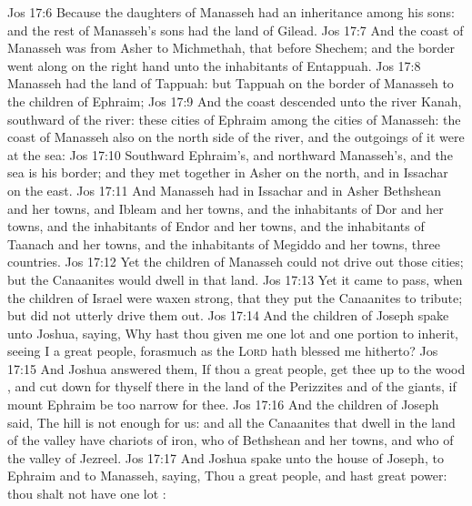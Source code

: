 \vs Jos 17:6 Because the daughters of Manasseh had an inheritance among his sons: and the rest of Manasseh's sons had the land of Gilead.
\vs Jos 17:7 And the coast of Manasseh was from Asher to Michmethah, that  before Shechem; and the border went along on the right hand unto the inhabitants of Entappuah.
\vs Jos 17:8  Manasseh had the land of Tappuah: but Tappuah on the border of Manasseh  to the children of Ephraim;
\vs Jos 17:9 And the coast descended unto the river Kanah, southward of the river: these cities of Ephraim  among the cities of Manasseh: the coast of Manasseh also  on the north side of the river, and the outgoings of it were at the sea:
\vs Jos 17:10 Southward  Ephraim's, and northward  Manasseh's, and the sea is his border; and they met together in Asher on the north, and in Issachar on the east.
\vs Jos 17:11 And Manasseh had in Issachar and in Asher Bethshean and her towns, and Ibleam and her towns, and the inhabitants of Dor and her towns, and the inhabitants of Endor and her towns, and the inhabitants of Taanach and her towns, and the inhabitants of Megiddo and her towns,  three countries.
\vs Jos 17:12 Yet the children of Manasseh could not drive out  those cities; but the Canaanites would dwell in that land.
\vs Jos 17:13 Yet it came to pass, when the children of Israel were waxen strong, that they put the Canaanites to tribute; but did not utterly drive them out.
\vs Jos 17:14 And the children of Joseph spake unto Joshua, saying, Why hast thou given me  one lot and one portion to inherit, seeing I  a great people, forasmuch as the \textsc{Lord} hath blessed me hitherto?
\vs Jos 17:15 And Joshua answered them, If thou  a great people,  get thee up to the wood , and cut down for thyself there in the land of the Perizzites and of the giants, if mount Ephraim be too narrow for thee.
\vs Jos 17:16 And the children of Joseph said, The hill is not enough for us: and all the Canaanites that dwell in the land of the valley have chariots of iron,  who  of Bethshean and her towns, and  who  of the valley of Jezreel.
\vs Jos 17:17 And Joshua spake unto the house of Joseph,  to Ephraim and to Manasseh, saying, Thou  a great people, and hast great power: thou shalt not have one lot :
